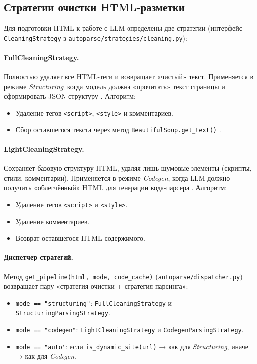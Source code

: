 \subsection{Стратегии очистки HTML-разметки}
\label{subsec:solution2}

Для подготовки HTML к работе с LLM определены две стратегии (интерфейс \texttt{CleaningStrategy} в \texttt{autoparse/strategies/cleaning.py}):

\paragraph{FullCleaningStrategy.}
Полностью удаляет все HTML-теги и возвращает «чистый» текст. Применяется в режиме \emph{Structuring}, когда модель должна «прочитать» текст страницы и сформировать JSON-структуру \cite{Brown2020}. Алгоритм:
\begin{itemize}
    \item Удаление тегов \texttt{<script>}, \texttt{<style>} и комментариев.
    \item Сбор оставшегося текста через метод \texttt{BeautifulSoup.get\_text()} \cite{BeautifulSoupDocumentation}.
\end{itemize}

\paragraph{LightCleaningStrategy.}
Сохраняет базовую структуру HTML, удаляя лишь шумовые элементы (скрипты, стили, комментарии). Применяется в режиме \emph{Codegen}, когда LLM должно получить «облегчённый» HTML для генерации кода-парсера \cite{Dong2022CacheLLM}. Алгоритм:
\begin{itemize}
    \item Удаление тегов \texttt{<script>} и \texttt{<style>}.
    \item Удаление комментариев.
    \item Возврат оставшегося HTML-содержимого.
\end{itemize}

\paragraph{Диспетчер стратегий.}
Метод \texttt{get\_pipeline(html, mode, code\_cache)} (\texttt{autoparse/dispatcher.py}) возвращает пару «стратегия очистки + стратегия парсинга»:
\begin{itemize}
    \item \texttt{mode == "structuring"}: \texttt{FullCleaningStrategy} и \texttt{StructuringParsingStrategy}.
    \item \texttt{mode == "codegen"}: \texttt{LightCleaningStrategy} и \texttt{CodegenParsingStrategy}.
    \item \texttt{mode == "auto"}: если \texttt{is\_dynamic\_site(url)} → как для \emph{Structuring}, иначе → как для \emph{Codegen}.
\end{itemize}


